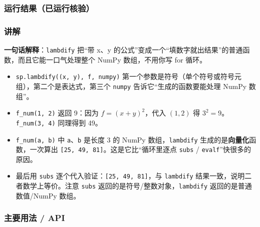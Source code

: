 \subsubsection{运行结果（已运行核验）}\label{ux8fd0ux884cux7ed3ux679cux5df2ux8fd0ux884cux6838ux9a8c-13}

\begin{Shaded}
\begin{Highlighting}[]
\end{Highlighting}
\end{Shaded}

\subsubsection{讲解}\label{ux8bb2ux89e3-13}

\textbf{一句话解释}：\texttt{lambdify} 把``带 x、y
的公式''变成一个``填数字就出结果''的普通函数，而且它能一口气处理整个
NumPy 数组，不用你写 for 循环。

\begin{itemize}
\tightlist
\item
  \texttt{sp.lambdify((x,\ y),\ f,\ \textquotesingle{}numpy\textquotesingle{})}
  第一个参数是符号（单个符号或符号元组），第二个是表达式，第三个
  \texttt{\textquotesingle{}numpy\textquotesingle{}}
  告诉它``生成的函数要能处理 NumPy 数组''。
\item
  \texttt{f\_num(1,\ 2)} 返回 9：因为 \(f=(x+y)^2\)，代入 \((1,2)\) 得
  \(3^2=9\)。\texttt{f\_num(3,\ 4)} 同理得到 49。
\item
  \texttt{f\_num(a,\ b)} 中 \texttt{a}、\texttt{b} 是长度 3 的 NumPy
  数组，\texttt{lambdify} 生成的是\textbf{向量化}函数，一次算出
  \texttt{{[}25,\ 49,\ 81{]}}。这是它比``循环里逐点 \texttt{subs} /
  \texttt{evalf}''快很多的原因。
\item
  最后用 \texttt{subs} 逐个代入验证：\texttt{{[}25,\ 49,\ 81{]}}，与
  \texttt{lambdify} 结果一致，说明二者数学上等价。注意 \texttt{subs}
  返回的是符号/整数对象，\texttt{lambdify} 返回的是普通数值/NumPy 数组。
\end{itemize}

\subsubsection{主要用法 / API}\label{ux4e3bux8981ux7528ux6cd5-api-13}

